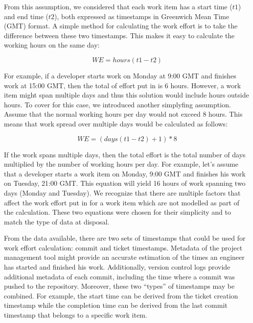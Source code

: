 \documentclass{mpaper}
\begin{document}
From this assumption, we considered that each work item has a start time ($t1$)
and end time ($t2$), both expressed as timestamps in Greenwich Mean Time (GMT)
format. A simple method for calculating the work effort is to take the
difference between these two timestamps. This makes it easy to calculate the
working hours on the same day:

\begin{equation}
  \label{eq-work-effort-simple}
  WE = hours(t1 - t2)
\end{equation}

For example, if a developer starts work on Monday at 9:00 GMT and finishes work
at 15:00 GMT, then the total of effort put in is 6 hours. However, a work item
might span multiple days and thus this solution would include hours outside
hours. To cover for this case, we introduced another simplyfing assumption.
Assume that the normal working hours per day would not exceed 8 hours. This
means that work spread over multiple days would be calculated as follows:

\begin{equation}
  \label{eq-work-effort-days}
  WE = (days(t1 - t2) + 1) * 8
\end{equation}

If the work spans multiple days, then the total effort is the total number of
days multiplied by the number of working hours per day. For example, let's
assume that a developer starts a work item on Monday, 9:00 GMT and finishes his
work on Tuesday, 21:00 GMT. This equation will yield 16 hours of work spanning
two days (Monday and Tuesday). We recognize that there are multiple factors that
affect the work effort put in for a work item which are not modelled as part of
the calculation. These two equations were chosen for their simplicity and to
match the type of data at disposal. 

From the data available, there are two sets of timestamps that could be used for
work effort calculation: commit and ticket timestamps. Metadata of the project
management tool might provide an accurate estimation of the times an engineer
has started and finished his work. Additionally, version control logs provide
additional metadata of each commit, including the time where a commit was pushed
to the repository. Moreover, these two ``types'' of timestamps may be combined.
For example, the start time can be derived from the ticket creation timestamp
while the completion time can be derived from the last commit timestamp that
belongs to a specific work item.
\end{document}
